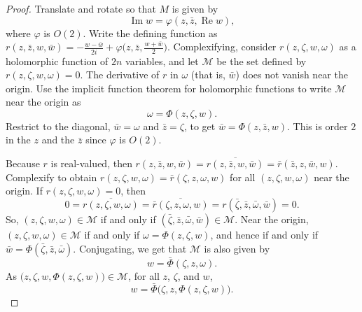 \documentclass[12pt,openany]{book}
\renewcommand{\Re}{\operatorname{Re}}
\renewcommand{\Im}{\operatorname{Im}}
\newcommand{\sM}{{\mathscr{M}}}
\theoremstyle{plain}
\theoremstyle{remark}
\theoremstyle{definition}
\theoremstyle{exercise}
\theoremstyle{example}
\begin{document}
\begin{proof}
Translate and rotate so that $M$ is given by
\begin{equation*}
\Im w = \varphi(z,\bar{z},\Re w) ,
\end{equation*}
where $\varphi$ is $O(2)$.
Write the defining function
as $r(z,\bar{z},w,\bar{w}) = -\frac{w-\bar{w}}{2i}
+\varphi\bigl(z,\bar{z},\frac{w+\bar{w}}{2}\bigr)$.
Complexifying, consider
$r(z,\zeta,w,\omega)$ as
a holomorphic function of $2n$ variables,
and let $\sM$ be the set defined by
$r(z,\zeta,w,\omega) = 0$.
The derivative of $r$ in
$\omega$ (that is, $\bar{w}$) does not vanish near the origin.
Use the implicit function theorem for holomorphic functions to write $\sM$
near the origin as
\begin{equation*}
\omega = \Phi(z,\zeta,w) .
\end{equation*}
Restrict to the diagonal, $\bar{w} = \omega$ and $\bar{z}=\zeta$,
to get
$\bar{w} = \Phi(z,\bar{z},w)$.  This is order $2$ in the $z$ and the $\bar{z}$
since $\varphi$ is $O(2)$.

Because $r$ is real-valued, then
$r(z,\bar{z},w,\bar{w}) =
\overline{r(z,\bar{z},w,\bar{w})} = \bar{r}(\bar{z},z,\bar{w},w)$.
Complexify to obtain
$r(z,\zeta,w,\omega) =
\bar{r}(\zeta,z,\omega,w)$ for all $(z,\zeta,w,\omega)$ near the origin.
If $r(z,\zeta,w,\omega) = 0$,
then
\begin{equation*}
0 = \overline{r(z,\zeta,w,\omega)} =
\overline{\bar{r}(\zeta,z,\omega,w)} =
r(\bar{\zeta},\bar{z},\bar{\omega},\bar{w}) =0.
\end{equation*}
So,
$(z,\zeta,w,\omega) \in \sM$
if and only if
$(\bar{\zeta},\bar{z},\bar{\omega},\bar{w}) \in \sM$.
Near the origin,
$(z,\zeta,w,\omega) \in \sM$ if and only if
$\omega = \Phi(z,\zeta,w)$, and hence
if and only if
$\bar{w} = \Phi(\bar{\zeta},\bar{z},\bar{\omega})$.
Conjugating, we get that $\sM$ is also given by
\begin{equation*}
w = \bar{\Phi}(\zeta,z,\omega).
\end{equation*}
As $\bigl(z,\zeta,w,\Phi(z,\zeta,w)\bigr) \in \sM$,
for all $z$, $\zeta$, and $w$,
\begin{equation*}
w = \bar{\Phi}\bigl(\zeta,z,\Phi(z,\zeta,w)\bigr).
\end{equation*}


\end{proof}
\end{document}
